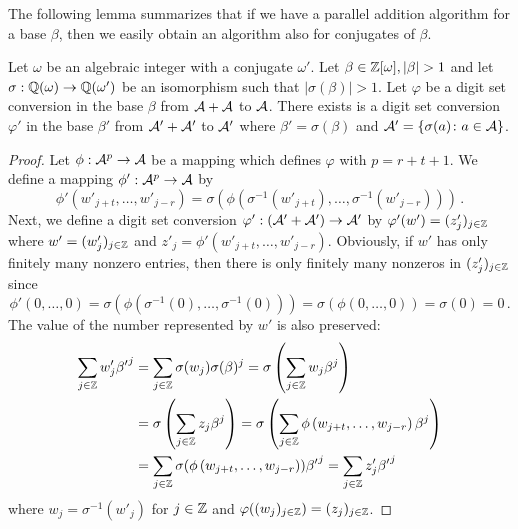 The following lemma summarizes that if we have a parallel addition algorithm for a base $\beta$, then we easily obtain an algorithm also for conjugates of $\beta$.
\begin{lem}
\label{lem:parAddAlgForConjugate}
Let $\omega$ be an algebraic integer with a conjugate $\omega'$. Let $\beta\in\Zomega, |\beta|>1$ and let $\sigma:\mathbb{Q}(\omega)\rightarrow \mathbb{Q}(\omega')$ be an isomorphism such that $|\sigma(\beta)|>1$. Let $\varphi$ be a digit set conversion  in the base $\beta$ from $\mathcal{A}+\mathcal{A}$ to $\mathcal{A}$. There exists  is a digit set conversion $\varphi'$ in the base $\beta'$ from $\mathcal{A}'+\mathcal{A}'$ to $\mathcal{A}'$ where $\beta'=\sigma(\beta)$ and $\mathcal{A}'=\{\sigma(a) \colon a\in\mathcal{A}\}$.
\end{lem}
\begin{proof}
Let $\phi:\mathcal{A}^p\rightarrow\mathcal{A}$ be a mapping which defines $\varphi$ with $p=r+t+1$. We define a mapping $\phi':\mathcal{A}^p\rightarrow \mathcal{A}$ by 
$$
\phi'(w'_{j+t}, \dots, w'_{j-r})=\sigma\left(\phi\left(\sigma^{-1}(w'_{j+t}), \dots, \sigma^{-1}(w'_{j-r})\right)\right)\,.
$$
Next, we define a digit set conversion  $\varphi':(\mathcal{A}'+\mathcal{A}')\rightarrow\mathcal{A}'$ by $\varphi'(w')=(z'_j)_{j\in\mathbb{Z}}$ where $w'=(w'_j)_{j\in\mathbb{Z}}$ and $z'_j=\phi'(w'_{j+t}, \dots, w'_{j-r})$. Obviously, if $w'$ has only finitely many nonzero entries, then there is only finitely many nonzeros in $(z'_j)_{j\in\mathbb{Z}}$   since
$$
\phi'(0, \dots, 0)=\sigma\left(\phi\left(\sigma^{-1}(0), \dots, \sigma^{-1}(0)\right)\right)=\sigma\left(\phi\left(0, \dots, 0\right)\right)=\sigma\left(0\right)=0\,.
$$
The value of the number represented by $w'$ is also preserved:
\begin{align*}
\sum_{j\in\mathbb{Z}}w'_j {\beta'}^j&=\sum_{j\in\mathbb{Z}}\sigma(w_j) \sigma(\beta)^j=\sigma\left(\sum_{j\in\mathbb{Z}}w_j\beta^j\right) \\
&=\sigma\left(\sum_{j\in\mathbb{Z}}z_j\beta^j \right)=\sigma\left(\sum_{j\in\mathbb{Z}}\phi\left(w_{j+t}, \dots,w_{j-r}\right)\beta^j\right) \\
&=\sum_{j\in\mathbb{Z}}\sigma(\phi\left(w_{j+t}, \dots,w_{j-r}\right)){\beta'}^j=\sum_{j\in\mathbb{Z}}z'_j {\beta'}^j
\end{align*}
where $w_j=\sigma^{-1}(w'_j)$ for $j\in\mathbb{Z}$ and $\varphi((w_j)_{j\in\mathbb{Z}})=(z_j)_{j\in\mathbb{Z}}$.
\end{proof}

